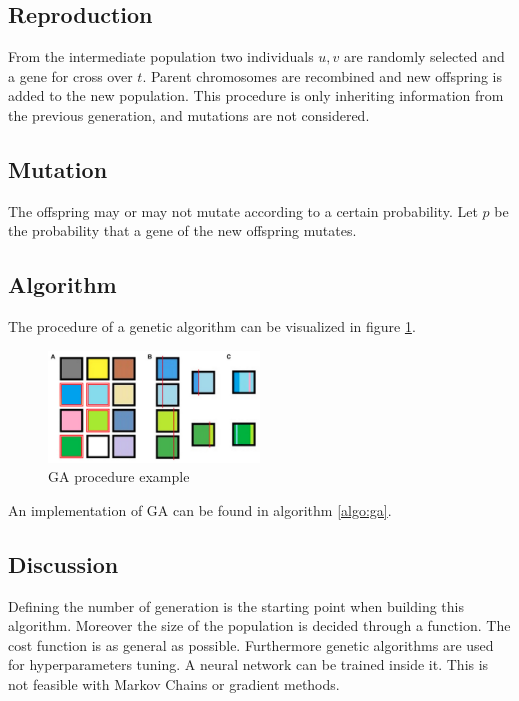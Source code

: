   \subsection{Reproduction}
  From the intermediate population two individuals \(u,v\) are randomly selected and a gene for cross over \(t\).
  Parent chromosomes are recombined and new offspring is added to the new population.
  This procedure is only inheriting information from the previous generation, and mutations are not considered.

  \subsection{Mutation}
  The offspring may or may not mutate according to a certain probability.
  Let \(p\) be the probability that a gene of the new offspring mutates.

  \subsection{Algorithm}
  The procedure of a genetic algorithm can be visualized in figure \ref{fig:ga-process}.

  \begin{figure}[H]
    \centering
    \includegraphics[width=0.5\textwidth]{ga_process.png}
    \caption{GA procedure example}
    \label{fig:ga-process}
  \end{figure}

  An implementation of GA can be found in algorithm \ref{algo:ga}.

  

  \subsection{Discussion}
  Defining the number of generation is the starting point when building this algorithm.
  Moreover the size of the population is decided through a function.
  The cost function is as general as possible.
  Furthermore genetic algorithms are used for hyperparameters tuning.
  A neural network can be trained inside it.
  This is not feasible with Markov Chains or gradient methods.

